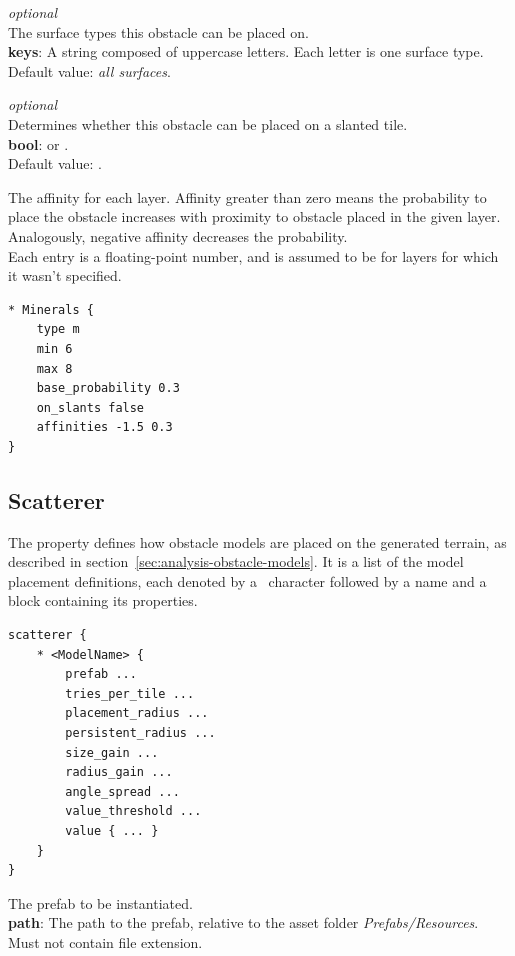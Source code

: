\emph{optional}\\
The surface types this obstacle can be placed on.\\
\textbf{keys}: A string composed of uppercase letters. Each letter is one surface type.\\
Default value: \emph{all surfaces}.

\emph{optional}\\
Determines whether this obstacle can be placed on a slanted tile.\\
\textbf{bool}:  or .\\
Default value: .

The affinity for each layer.
Affinity greater than zero means the probability to place the obstacle increases with proximity to obstacle placed in the given layer.
Analogously, negative affinity decreases the probability.\\
Each entry is a floating-point number, and is assumed to be  for layers for which it wasn't specified.

\pagebreak

\begin{verbatim}
* Minerals {
    type m
    min 6
    max 8
    base_probability 0.3
    on_slants false
    affinities -1.5 0.3
}
\end{verbatim}

\subsection{Scatterer}

The  property defines how obstacle models are placed on the generated terrain, as described in section~\ref{sec:analysis-obstacle-models}.
It is a list of the model placement definitions, each denoted by a \mono{*}~character followed by a name and a block containing its properties.

\begin{verbatim}
scatterer {
    * <ModelName> {
        prefab ...
        tries_per_tile ...
        placement_radius ...
        persistent_radius ...
        size_gain ...
        radius_gain ...
        angle_spread ...
        value_threshold ...
        value { ... }
    }
}
\end{verbatim}

The prefab to be instantiated.\\
\textbf{path}: The path to the prefab, relative to the asset folder \emph{Prefabs/Resources}. Must not contain file extension.

